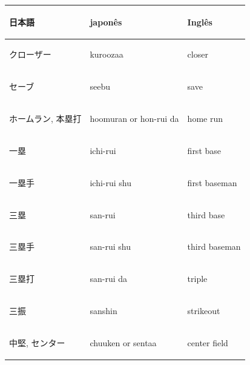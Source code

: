 %
%
		\begin{tabular}{lll}
			\begin{CJK}{UTF8}{min}日本語\end{CJK} & japon\^es& Ingl\^es\\\hline\hline
			\begin{CJK}{UTF8}{min}クローザー \end{CJK} &kuroozaa                     & closer              \\\hline
			\begin{CJK}{UTF8}{min}セーブ \end{CJK} &seebu                          & save                \\\hline
			\begin{CJK}{UTF8}{min}ホームラン, 本塁打 \end{CJK} &hoomuran or hon-rui da  & home run            \\\hline
			\begin{CJK}{UTF8}{min}一塁 \end{CJK} &ichi-rui                        & first base          \\\hline
			\begin{CJK}{UTF8}{min}一塁手 \end{CJK} &ichi-rui shu                   & first baseman       \\\hline
			\begin{CJK}{UTF8}{min}三塁 \end{CJK} &san-rui                         & third base          \\\hline
			\begin{CJK}{UTF8}{min}	三塁手 \end{CJK} &san-rui shu                    & third baseman       \\\hline
			\begin{CJK}{UTF8}{min}三塁打 \end{CJK} &san-rui da                     & triple              \\\hline
			\begin{CJK}{UTF8}{min}三振 \end{CJK} &sanshin                         & strikeout           \\\hline
			\begin{CJK}{UTF8}{min}中堅, センター \end{CJK} &chuuken or sentaa         & center field        \\\hline

\end{tabular}
